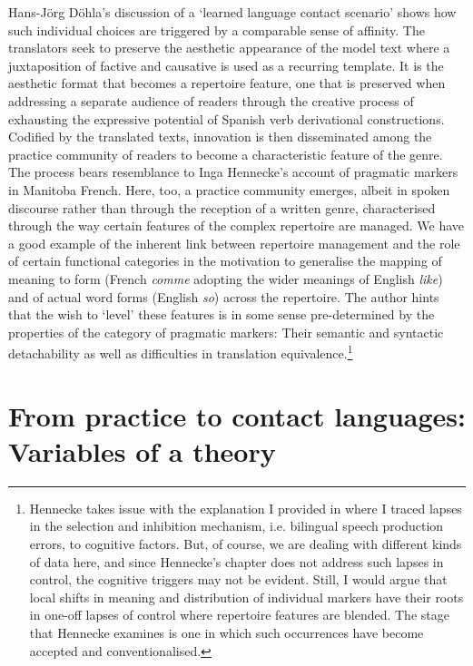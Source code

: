 \documentclass[output=paper]{langscibook}
\begin{document}
Hans-Jörg Döhla’s discussion of a ‘learned language contact scenario’ shows how such individual choices are triggered by a comparable sense of affinity. The translators seek to preserve the aesthetic appearance of the model text where a juxtaposition of factive and causative is used as a recurring template. It is the aesthetic format that becomes a repertoire feature, one that is preserved when addressing a separate audience of readers through the creative process of exhausting the expressive potential of Spanish verb derivational constructions. Codified by the translated texts, innovation is then disseminated among the practice community of readers to become a characteristic feature of the genre. The process bears resemblance to Inga Hennecke’s account of pragmatic markers in Manitoba French. Here, too, a practice community emerges, albeit in spoken discourse rather than through the reception of a written genre, characterised through the way certain features of the complex repertoire are managed. We have a good example of the inherent link between repertoire management and the role of certain functional categories in the motivation to generalise the mapping of meaning to form (French \textit{comme} adopting the wider meanings of English \textit{like}) and of actual word forms (English \textit{so}) across the repertoire. The author hints that the wish to ‘level’ these features is in some sense pre-determined by the properties of the category of pragmatic markers: Their semantic and syntactic detachability as well as difficulties in translation equivalence.\footnote{Hennecke takes issue with the explanation I provided in \citet{matras_language_2020} where I traced lapses in the selection and inhibition mechanism, i.e. bilingual speech production errors, to cognitive factors. But, of course, we are dealing with different kinds of data here, and since Hennecke’s chapter does not address such lapses in control, the cognitive triggers may not be evident. Still, I would argue that local shifts in meaning and distribution of individual markers have their roots in one-off lapses of control where repertoire features are blended. The stage that Hennecke examines is one in which such occurrences have become accepted and conventionalised.}

\section{From practice to contact languages: Variables of a theory}
\end{document}
